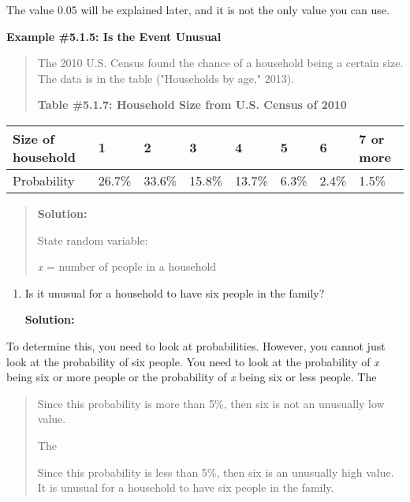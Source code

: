 \documentclass[]{book}
\begin{document}
The value 0.05 will be explained later, and it is not the only value you
can use.

\textbf{Example \#5.1.5: Is the Event Unusual}

\begin{quote}
The 2010 U.S. Census found the chance of a household being a certain
size. The data is in the table ("Households by age," 2013).

\textbf{Table \#5.1.7: Household Size from U.S. Census of 2010}
\end{quote}

\begin{longtable}[]{@{}llllllll@{}}
\toprule
Size of household & 1 & 2 & 3 & 4 & 5 & 6 & 7 or more\tabularnewline
\midrule
\endhead
Probability & 26.7\% & 33.6\% & 15.8\% & 13.7\% & 6.3\% & 2.4\% & 1.5\%\tabularnewline
\bottomrule
\end{longtable}

\begin{quote}
\textbf{Solution:}

State random variable:

\emph{x} = number of people in a household
\end{quote}

\begin{enumerate}
\def\labelenumi{\alph{enumi}.}
\item
  Is it unusual for a household to have six people in the family?

  \textbf{Solution:}
\end{enumerate}

To determine this, you need to look at probabilities. However, you
cannot just look at the probability of six people. You need to look at
the probability of \emph{x} being six or more people or the probability of
\emph{x} being six or less people. The

\begin{quote}
Since this probability is more than 5\%, then six is not an unusually
low value.

The

Since this probability is less than 5\%, then six is an unusually high
value. It is unusual for a household to have six people in the family.
\end{quote}
\end{document}
